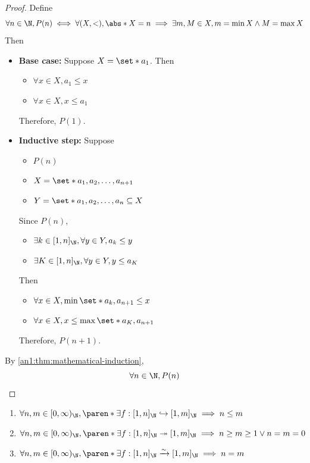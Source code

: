 \begin{proof}
  Define
  \[
    \forall n \in \N, P(n) \iff \forall (X, <), \abs*{X} = n \implies \exists m, M \in X, m = \min X \land M = \max X
  \]
  Then
  \begin{itemize}
    \item \textbf{Base case:} Suppose $X = \set*{a_{1}}$. Then
          \begin{itemize}
            \item $\forall x \in X, a_{1} \leq x$
            \item $\forall x \in X, x \leq a_{1}$
          \end{itemize}
          Therefore, $P(1)$.
    \item \textbf{Inductive step:} Suppose
          \begin{itemize}
            \item $P(n)$
            \item $X = \set*{a_{1}, a_{2}, \dots, a_{n + 1}}$
            \item $Y = \set*{a_{1}, a_{2}, \dots, a_{n}} \subseteq X$
          \end{itemize}
          Since $P(n)$,
          \begin{itemize}
            \item $\exists k \in [1, n]_{\N}, \forall y \in Y, a_{k} \leq y$
            \item $\exists K \in [1, n]_{\N}, \forall y \in Y, y \leq a_{K}$
          \end{itemize}
          Then
          \begin{itemize}
            \item $\forall x \in X, \min\set*{{a_{k}, a_{n + 1}}} \leq x$
            \item $\forall x \in X, x \leq \max\set*{{a_{K}, a_{n + 1}}}$
          \end{itemize}
          Therefore, $P(n + 1)$.
  \end{itemize}
  By \cref{an1:thm:mathematical-induction},
  \[
    \forall n \in \N, P(n)
  \]
\end{proof}

\begin{lemma} \label{an1:lem:properties-of-Nm-Nn}
  \leavevmode\par
  \begin{enumerate}[label=\textbf{(\Alph*)}]
    \item $\forall n, m \in [0, \infty)_{\N}, \paren*{\exists f: [1, n]_{\N}
              \hookrightarrow [1, m]_{\N}} \implies n \leq m$
    \item $\forall n, m \in [0, \infty)_{\N}, \paren*{\exists f: [1, n]_{\N}
              \twoheadrightarrow [1, m]_{\N}} \implies n \geq m \geq 1 \lor n = m = 0$
    \item $\forall n, m \in [0, \infty)_{\N}, \paren*{\exists f: [1, n]_{\N}
              \xrightarrow{\sim} [1, m]_{\N}} \implies n = m$
  \end{enumerate}
\end{lemma}
